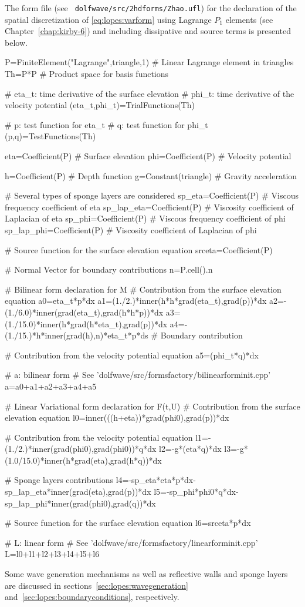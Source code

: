 The \ufl form file (see {\tt
  dolfwave/src/2hdforms/Zhao.ufl}) for the declaration of the spatial
discretization of \eqref{eq:lopes:varform} using Lagrange
$P_1$ elements (see Chapter~\ref{chap:kirby-6}) and including  dissipative and
source terms is presented below.
\begin{python}
P=FiniteElement("Lagrange",triangle,1) # Linear Lagrange element in triangles
Th=P*P # Product space for basis functions

# eta_t: time derivative of the surface elevation
# phi_t: time derivative of the velocity potential
(eta_t,phi_t)=TrialFunctions(Th)

# p: test function for eta_t
# q: test function for phi_t
(p,q)=TestFunctions(Th)

eta=Coefficient(P) # Surface elevation
phi=Coefficient(P) # Velocity potential

h=Coefficient(P) # Depth function
g=Constant(triangle) # Gravity acceleration

# Several types of sponge layers are considered
sp_eta=Coefficient(P) # Viscous frequency coefficient of eta
sp_lap_eta=Coefficient(P) # Viscosity coefficient of Laplacian of eta
sp_phi=Coefficient(P) # Viscous frequency coefficient of phi
sp_lap_phi=Coefficient(P) # Viscosity coefficient of Laplacian of phi

# Source function for the surface elevation equation
srceta=Coefficient(P)

# Normal Vector for boundary contributions
n=P.cell().n

# Bilinear form declaration for M
# Contribution from the surface elevation equation
a0=eta_t*p*dx
a1=(1./2.)*inner(h*h*grad(eta_t),grad(p))*dx
a2=-(1./6.0)*inner(grad(eta_t),grad(h*h*p))*dx
a3=(1./15.0)*inner(h*grad(h*eta_t),grad(p))*dx
a4=-(1./15.)*h*inner(grad(h),n)*eta_t*p*ds # Boundary contribution

# Contribution from the velocity potential equation
a5=(phi_t*q)*dx

# a: bilinear form
# See 'dolfwave/src/formsfactory/bilinearforminit.cpp'
a=a0+a1+a2+a3+a4+a5

# Linear Variational form declaration for F(t,U)
# Contribution from the surface elevation equation
l0=inner(((h+eta))*grad(phi0),grad(p))*dx

# Contribution from the velocity potential equation
l1=-(1./2.)*inner(grad(phi0),grad(phi0))*q*dx
l2=-g*(eta*q)*dx
l3=-g*(1.0/15.0)*inner(h*grad(eta),grad(h*q))*dx

# Sponge layers contributions
l4=-sp_eta*eta*p*dx-sp_lap_eta*inner(grad(eta),grad(p))*dx
l5=-sp_phi*phi0*q*dx-sp_lap_phi*inner(grad(phi0),grad(q))*dx

# Source function for the surface elevation equation
l6=srceta*p*dx

# L: linear form
# See 'dolfwave/src/formsfactory/linearforminit.cpp'
L=l0+l1+l2+l3+l4+l5+l6
\end{python}
Some wave generation mechanisms as well as reflective walls
 and sponge layers are discussed in
 sections~\ref{sec:lopes:wavegeneration}
 and~\ref{sec:lopes:boundaryconditions},
 respectively.


